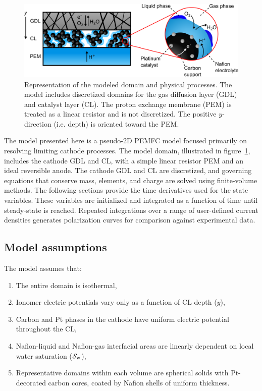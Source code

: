 \documentclass[final,3p,times,twocolumn]{elsarticle}    %
\begin{document}
\begin{figure}
    \centering
    \includegraphics[width=5.825in]{figures/core-shell-5_825in.png}
    \caption{Representation of the modeled domain and physical processes. The model includes discretized domains for the gas diffusion layer (GDL) and catalyst layer (CL). The proton exchange membrane (PEM) is treated as a linear resistor and is not discretized. The positive $y$-direction (i.e. depth) is oriented toward the PEM.}
    \label{fig:core-shell}
\end{figure}

The model presented here is a pseudo-2D PEMFC model focused primarily on resolving limiting cathode processes. The model domain, illustrated in figure~\ref{fig:core-shell}, includes the cathode GDL and CL, with a simple linear resistor PEM and an ideal reversible anode. The cathode GDL and CL are discretized, and governing equations that conserve mass, elements, and charge are solved using finite-volume methods. The following sections provide the time derivatives used for the state variables. These variables are initialized and integrated as a function of time until steady-state is reached. Repeated integrations over a range of user-defined current densities generates polarization curves for comparison against experimental data. 

\subsection{Model assumptions}
The model assumes that:

\begin{enumerate}[label=(\roman*.)]
    \item The entire domain is isothermal,
    \item Ionomer electric potentials vary only as a function of CL depth ($y$),
    \item Carbon and Pt phases in the cathode have uniform electric potential throughout the CL,
    \item Nafion-liquid and Nafion-gas interfacial areas are linearly dependent on local water saturation (${\cal S}_{\rm w}$),
    \item Representative domains within each volume are spherical solids with Pt-decorated carbon cores, coated by Nafion shells of uniform thickness.
\end{enumerate}
\end{document}
